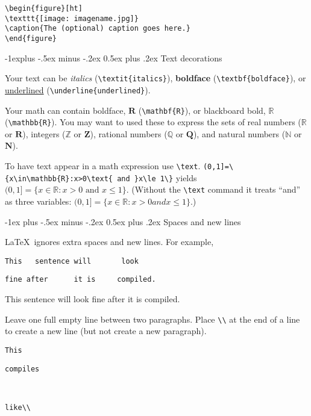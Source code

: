 \documentclass[10pt]{article}
\makeatletter
\renewcommand{\section}{\@startsection{section}{1}{0mm}%
                                {-1ex plus -.5ex minus -.2ex}%
                                {0.5ex plus .2ex}%
                                {\normalfont\large\bfseries}}
\renewcommand{\subsection}{\@startsection{subsection}{2}{0mm}%
                                {-1explus -.5ex minus -.2ex}%
                                {0.5ex plus .2ex}%
                                {\normalfont\normalsize\bfseries}}
\makeatother
\begin{document}
\begin{multicols}{1}
\verb!\begin{figure}[ht]!\\
\verb!\texttt{[image: imagename.jpg]}!\\
\verb!\caption{The (optional) caption goes here.}!\\
\verb!\end{figure}!

\subsection{Text decorations}

Your text can be \textit{italics} (\verb!\textit{italics}!), \textbf{boldface} (\verb!\textbf{boldface}!), or \underline{underlined} (\verb!\underline{underlined}!).

Your math can contain boldface, $\mathbf{R}$ (\verb!\mathbf{R}!), or blackboard bold, $\mathbb{R}$ (\verb!\mathbb{R}!). You may want to used these to express the sets of real numbers ($\mathbb{R}$ or $\mathbf{R}$), integers ($\mathbb{Z}$ or $\mathbf{Z}$), rational numbers ($\mathbb{Q}$ or $\mathbf{Q}$), and natural numbers ($\mathbb{N}$ or $\mathbf{N}$).

To have text appear in a math expression use \verb!\text!. \verb!(0,1]=\{x\in\mathbb{R}:x>0\text{ and }x\le 1\}! yields $(0,1]=\{x\in\mathbb{R}:x>0\text{ and }x\le 1\}$. (Without the \verb!\text! command it treats ``and'' as three variables: $(0,1]=\{x\in\mathbb{R}:x>0 and x\le 1\}$.)



\section{Spaces and new lines}

\LaTeX\ ignores extra spaces and new lines. For example, 

\verb!This   sentence will       look!

\verb!fine after      it is     compiled.!

This   sentence will       look
fine after      it is     compiled.


Leave one full empty line between two paragraphs. Place \verb!\\! at the end of a line to create a new line (but not create a new paragraph).

\verb!This!

\verb!compiles!

~

\verb!like\\!


\end{multicols}
\end{document}
